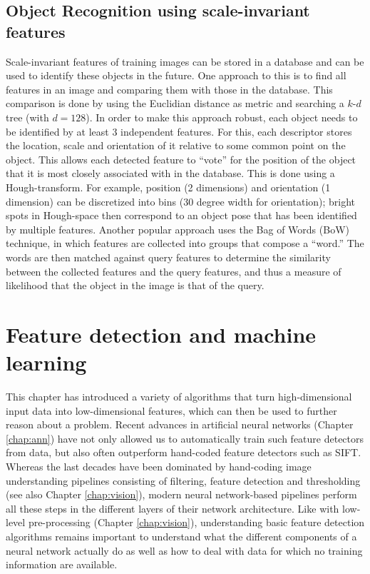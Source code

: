 \begin{enumerate}
\subsection{Object Recognition using scale-invariant features}
Scale-invariant features of training images can be stored in a database and can be used to identify these objects in the future. One approach to this is to find all features in an image and comparing them with those in the database. This comparison is done by using the Euclidian distance as metric and searching a $k$-$d$ tree (with $d=128$). In order to make this approach robust, each object needs to be identified by at least 3 independent features. For this, each descriptor stores the location, scale and orientation of it relative to some common point on the object. This allows each detected feature to ``vote'' for the position of the object that it is most closely associated with in the database.  This is done using a Hough-transform. For example, position (2 dimensions) and orientation (1 dimension) can be discretized into bins (30 degree width for orientation); bright spots in Hough-space then correspond to an object pose that has been identified by multiple features. Another popular approach uses the Bag of Words (BoW) technique, in which features are collected into groups that compose a ``word.'' The words are then matched against query features to determine the similarity between the collected features and the query features, and thus a measure of likelihood that the object in the image is that of the query.

\section{Feature detection and machine learning}
This chapter has introduced a variety of algorithms that turn high-dimensional input data into low-dimensional features, which can then be used to further reason about a problem. Recent advances in artificial neural networks (Chapter \ref{chap:ann}) have not only allowed us to automatically train such feature detectors from data, but also often outperform hand-coded feature detectors such as SIFT. Whereas the last decades have been dominated by hand-coding image understanding pipelines consisting of filtering, feature detection and thresholding (see also Chapter \ref{chap:vision}), modern neural network-based pipelines perform all these steps in the different layers of their network architecture. Like with low-level pre-processing (Chapter \ref{chap:vision}), understanding basic feature detection algorithms remains important to understand what the different components of a neural network actually do as well as how to deal with data for which no training information are available. 


\end{enumerate}
